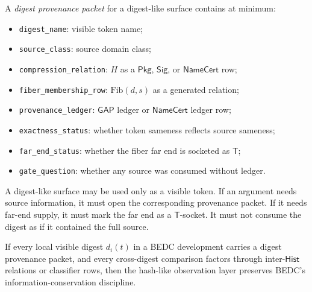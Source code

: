 \begin{definition}
\label{def:hash-like-digest-provenance-packet}
A \emph{digest provenance packet} for a digest-like surface contains at minimum:
\begin{itemize}
\item \texttt{digest\_name}: visible token name;
\item \texttt{source\_class}: source domain class;
\item \texttt{compression\_relation}: $H$ as a $\mathsf{Pkg}$, $\mathsf{Sig}$, or $\mathsf{NameCert}$ row;
\item \texttt{fiber\_membership\_row}: $\mathrm{Fib}(d, s)$ as a generated relation;
\item \texttt{provenance\_ledger}: $\mathsf{GAP}$ ledger or $\mathsf{NameCert}$ ledger row;
\item \texttt{exactness\_status}: whether token sameness reflects source sameness;
\item \texttt{far\_end\_status}: whether the fiber far end is socketed as $\mathsf{T}$;
\item \texttt{gate\_question}: whether any source was consumed without ledger.
\end{itemize}
\end{definition}

\begin{principle}
\label{prin:hash-like-no-hidden-source-consumption}
A digest-like surface may be used only as a visible token. If an argument needs source information, it must open the corresponding provenance packet. If it needs far-end supply, it must mark the far end as a $\mathsf{T}$-socket. It must not consume the digest as if it contained the full source.
\end{principle}

\begin{theorem}
\label{thm:hash-like-info-conservation}
If every local visible digest $d_i(t)$ in a BEDC development carries a digest provenance packet, and every cross-digest comparison factors through inter-$\mathsf{Hist}$ relations or classifier rows, then the hash-like observation layer preserves BEDC's information-conservation discipline.
\end{theorem}

